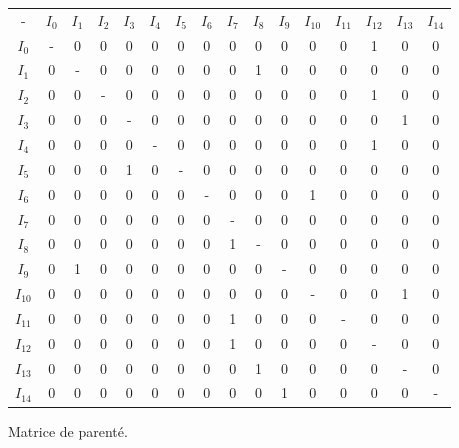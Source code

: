 \documentclass[utf8,final]{stageM2R} %
\begin{document}
\begin{figure}
  \centering
  \begin{tabular}{|c||c|c|c|c|c|c|c|c|c|c|c|c|c|c|c|}
    \hline
    - & $I_{0}$ & $I_{1}$ & $I_{2}$ & $I_{3}$ & $I_{4}$ & $I_{5}$ & $I_{6}$ & $I_{7}$ & $I_{8}$ & $I_{9}$ & $I_{10}$ & $I_{11}$ & $I_{12}$ & $I_{13}$ & $I_{14}$ \\ \hhline{|=::=|=|=|=|=|=|=|=|=|=|=|=|=|=|=|}
    $I_{0}$ & - & 0 & 0 & 0 & 0 & 0 & 0 & 0 & 0 & 0 & 0 & 0 & 1 & 0 & 0 \\ \hline 
    $I_{1}$ & 0 & - & 0 & 0 & 0 & 0 & 0 & 0 & 1 & 0 & 0 & 0 & 0 & 0 & 0 \\ \hline 
    $I_{2}$ & 0 & 0 & - & 0 & 0 & 0 & 0 & 0 & 0 & 0 & 0 & 0 & 1 & 0 & 0 \\ \hline 
    $I_{3}$ & 0 & 0 & 0 & - & 0 & 0 & 0 & 0 & 0 & 0 & 0 & 0 & 0 & 1 & 0 \\ \hline 
    $I_{4}$ & 0 & 0 & 0 & 0 & - & 0 & 0 & 0 & 0 & 0 & 0 & 0 & 1 & 0 & 0 \\ \hline 
    $I_{5}$ & 0 & 0 & 0 & 1 & 0 & - & 0 & 0 & 0 & 0 & 0 & 0 & 0 & 0 & 0 \\ \hline 
    $I_{6}$ & 0 & 0 & 0 & 0 & 0 & 0 & - & 0 & 0 & 0 & 1 & 0 & 0 & 0 & 0 \\ \hline 
    $I_{7}$ & 0 & 0 & 0 & 0 & 0 & 0 & 0 & - & 0 & 0 & 0 & 0 & 0 & 0 & 0 \\ \hline 
    $I_{8}$ & 0 & 0 & 0 & 0 & 0 & 0 & 0 & 1 & - & 0 & 0 & 0 & 0 & 0 & 0 \\ \hline 
    $I_{9}$ & 0 & 1 & 0 & 0 & 0 & 0 & 0 & 0 & 0 & - & 0 & 0 & 0 & 0 & 0 \\ \hline 
    $I_{10}$& 0 & 0 & 0 & 0 & 0 & 0 & 0 & 0 & 0 & 0 & - & 0 & 0 & 1 & 0 \\ \hline 
    $I_{11}$& 0 & 0 & 0 & 0 & 0 & 0 & 0 & 1 & 0 & 0 & 0 & - & 0 & 0 & 0 \\ \hline 
    $I_{12}$& 0 & 0 & 0 & 0 & 0 & 0 & 0 & 1 & 0 & 0 & 0 & 0 & - & 0 & 0 \\ \hline 
    $I_{13}$& 0 & 0 & 0 & 0 & 0 & 0 & 0 & 0 & 1 & 0 & 0 & 0 & 0 & - & 0 \\ \hline 
    $I_{14}$& 0 & 0 & 0 & 0 & 0 & 0 & 0 & 0 & 0 & 1 & 0 & 0 & 0 & 0 & - \\ \hline 

  \end{tabular}
  \caption{Matrice de parenté.}
  \label{parentage_matrix_example}
\end{figure}
\end{document}
